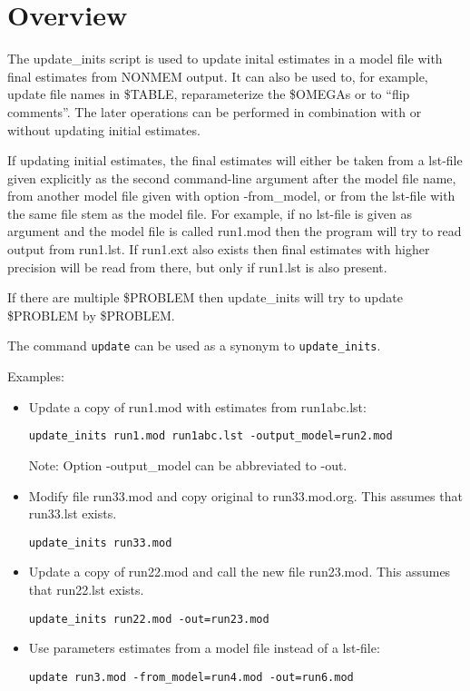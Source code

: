 
\setlength{\evensidemargin}{0pt}
\setlength{\oddsidemargin}{0pt}




\maketitle


\section{Overview}
The update\_inits script is used to update inital estimates in a model file with final
estimates from NONMEM output. It can also be used to, for example, update file names in \$TABLE, reparameterize
the \$OMEGAs or to ``flip comments''. The later operations can be performed in combination with 
or without updating initial estimates.

If updating initial estimates, the final estimates will either be taken from a lst-file given explicitly as the second 
command-line argument after the model file name, from another model file given with option -from\_model, 
or from the lst-file with the same file stem as the model file.
For example, if no lst-file is given as argument and the model file is called run1.mod then the program will try to read output from
run1.lst. If run1.ext also exists then final estimates with higher precision will be read from there, 
but only if run1.lst is also present.

If there are multiple \$PROBLEM then update\_inits will try to update \$PROBLEM by \$PROBLEM.

The command \verb|update| can be used as a synonym to \verb|update_inits|.

\noindent Examples:
\begin{itemize}
\item Update a copy of run1.mod with estimates from run1abc.lst:
\begin{verbatim}
update_inits run1.mod run1abc.lst -output_model=run2.mod
\end{verbatim}
Note: Option -output\_model can be abbreviated to -out.
\item Modify file run33.mod and copy original to run33.mod.org. This assumes that run33.lst exists.
\begin{verbatim}
update_inits run33.mod
\end{verbatim}
\item Update a copy of run22.mod and call the new file run23.mod. This assumes that run22.lst exists.
\begin{verbatim}
update_inits run22.mod -out=run23.mod
\end{verbatim}
\item Use parameters estimates from a model file instead of a lst-file:
\begin{verbatim}
update run3.mod -from_model=run4.mod -out=run6.mod
\end{verbatim}
\end{itemize}

